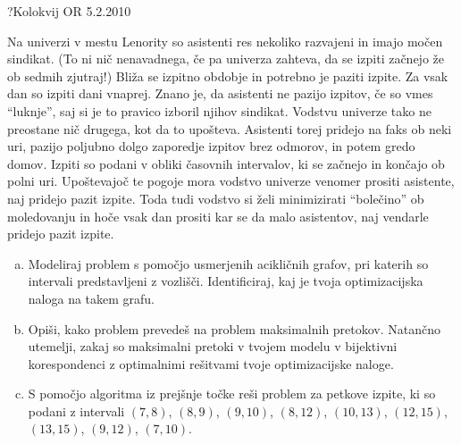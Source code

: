\begin{naloga}{?}{Kolokvij OR 5.2.2010}
\begin{vprasanje}
Na univerzi v mestu Lenority so asistenti res nekoliko razvajeni
in imajo močen sindikat.
(To ni nič nenavadnega, če pa univerza zahteva,
da se izpiti začnejo že ob sedmih zjutraj!)
Bliža se izpitno obdobje in potrebno je paziti izpite.
Za vsak dan so izpiti dani vnaprej.
Znano je, da asistenti ne pazijo izpitov, če so vmes ``luknje'',
saj si je to pravico izboril njihov sindikat.
Vodstvu univerze tako ne preostane nič drugega, kot da to upošteva.
Asistenti torej pridejo na faks ob neki uri,
pazijo poljubno dolgo zaporedje izpitov brez odmorov, in potem gredo domov.
Izpiti so podani v obliki časovnih intervalov,
ki se začnejo in končajo ob polni uri.
Upoštevajoč te pogoje mora vodstvo univerze venomer prositi asistente,
naj pridejo pazit izpite.
Toda tudi vodstvo si želi minimizirati ``bolečino'' ob moledovanju
in hoče vsak dan prositi kar se da malo asistentov,
naj vendarle pridejo pazit izpite.

\begin{enumerate}[(a)]
\item Modeliraj problem s pomočjo usmerjenih acikličnih grafov,
pri katerih so intervali predstavljeni z vozlišči.
Identificiraj, kaj je tvoja optimizacijska naloga na takem grafu.

\item Opiši, kako problem prevedeš na problem maksimalnih pretokov.
Natančno utemelji,
zakaj so maksimalni pretoki v tvojem modelu v bijektivni korespondenci
z optimalnimi rešitvami tvoje optimizacijske naloge.

\item S pomočjo algoritma iz prejšnje točke reši problem za petkove izpite,
ki so podani z intervali $(7, 8)$, $(8, 9)$, $(9, 10)$, $(8, 12)$,
$(10, 13)$, $(12, 15)$, $(13, 15)$, $(9, 12)$, $(7, 10)$.
\end{enumerate}
\end{vprasanje}
\begin{odgovor}
\end{odgovor}
\end{naloga}

